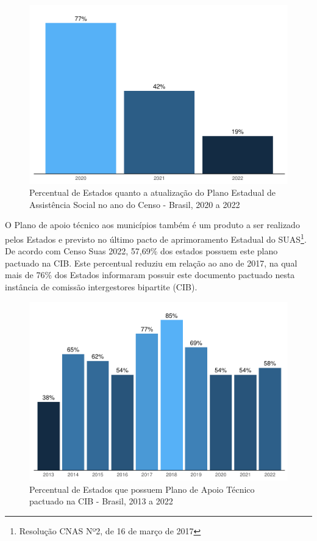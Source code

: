 \documentclass[
  brazilian]{report}
\begin{document}
\begin{figure}
\includegraphics{Censo-SUAS-2022_files/figure-latex/PEAS-1} \caption[Percentual de Estados quanto a atualização do Plano Estadual de Assistência Social no ano do Censo - Brasil, 2020 a 2022]{Percentual de Estados quanto a atualização do Plano Estadual de Assistência Social no ano do Censo - Brasil, 2020 a 2022}\label{fig:PEAS}
\end{figure}

O Plano de apoio técnico aos municípios também é um produto a ser
realizado pelos Estados e previsto no último pacto de aprimoramento
Estadual do SUAS\footnote{Resolução CNAS Nº2, de 16 de março de 2017}.
De acordo com Censo Suas 2022, 57,69\% dos estados possuem este plano
pactuado na CIB. Este percentual reduziu em relação ao ano de 2017, na
qual mais de 76\% dos Estados informaram possuir este documento pactuado
nesta instância de comissão intergestores bipartite (CIB).

\begin{figure}
\includegraphics{Censo-SUAS-2022_files/figure-latex/plan_apoio_tec-1} \caption[Percentual de Estados que possuem Plano de Apoio Técnico pactuado na CIB - Brasil, 2013 a 2022]{Percentual de Estados que possuem Plano de Apoio Técnico pactuado na CIB - Brasil, 2013 a 2022}\label{fig:plan_apoio_tec}
\end{figure}
\end{document}
